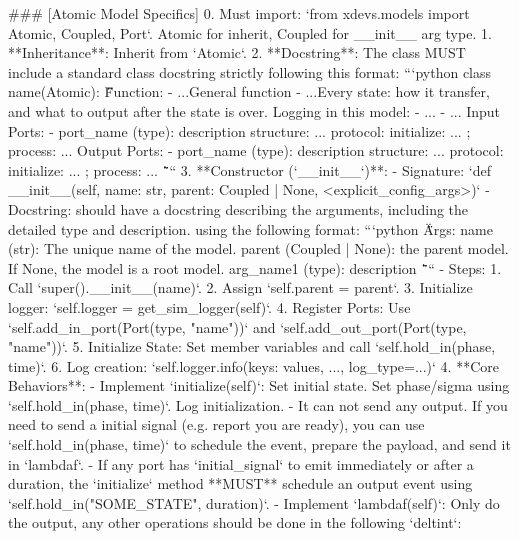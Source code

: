 \begin{promptbox}
### [Atomic Model Specifics]
0. Must import: `from xdevs.models import Atomic, Coupled, Port`. Atomic for inherit, Coupled for __init__ arg type.
1. **Inheritance**: Inherit from `Atomic`.
2. **Docstring**: The class MUST include a standard class docstring strictly following this format:
    ```python
    class {name}(Atomic):
        \"\"\"
        Function: 
            - ...General function
            - ...Every state: how it transfer, and what to output after the state is over.
        Logging in this model:
            - ...
            - ...
        Input Ports:
          - port_name (type): description
            structure: ...
            protocol: initialize: ... ; process: ...
        Output Ports:
          - port_name (type): description
            structure: ...
            protocol: initialize: ... ; process: ...
        \"\"\"
    ```
3. **Constructor (`__init__`)**:
    - Signature: `def __init__(self, name: str, parent: Coupled | None, <explicit_config_args>)`
    - Docstring: should have a docstring describing the arguments, including the detailed type and description. using the following format:
        ```python
        \"\"\"
        Args:
            name (str): The unique name of the model.
            parent (Coupled | None): the parent model. If None, the model is a root model.
            arg_name1 (type): description
        \"\"\"
        ```
    - Steps:
        1. Call `super().__init__(name)`.
        2. Assign `self.parent = parent`.
        3. Initialize logger: `self.logger = get_sim_logger(self)`.
        4. Register Ports: Use `self.add_in_port(Port(type, "name"))` and `self.add_out_port(Port(type, "name"))`.
        5. Initialize State: Set member variables and call `self.hold_in(phase, time)`. 
        6. Log creation: `self.logger.info({{keys: values, ...}}, log_type=...)`
4. **Core Behaviors**:
    - Implement `initialize(self)`: Set initial state. Set phase/sigma using `self.hold_in(phase, time)`. Log initialization.
        - It can not send any output. If you need to send a initial signal (e.g. report you are ready), you can use `self.hold_in(phase, time)` to schedule the event, prepare the payload, and send it in `lambdaf`.
        - If any port has `initial_signal` to emit immediately or after a duration, the `initialize` method **MUST** schedule an output event using `self.hold_in("SOME_STATE", duration)`.
    - Implement `lambdaf(self)`: Only do the output, any other operations should be done in the following `deltint`:

\end{promptbox}
